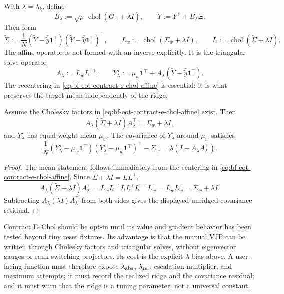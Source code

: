 With \(\lambda=\lambda_k\), define
\[
  B_\lambda
  :=
  \sqrt{\rho}\,\operatorname{chol}(G_+ + \lambda I),
  \qquad
  \widetilde Y
  :=
  Y^+ + B_\lambda\Xi .
\]
Then form
\[
  \widetilde\Sigma
  :=
  \frac1N
  (\widetilde Y-\bar{\widetilde y}\mathbf 1^\top)
  (\widetilde Y-\bar{\widetilde y}\mathbf 1^\top)^\top ,
  \qquad
  L_w:=\operatorname{chol}(\Sigma_w+\lambda I),
  \qquad
  L_{\widetilde{}}:=\operatorname{chol}(\widetilde\Sigma+\lambda I).
\]
The affine operator is not formed with an inverse explicitly.  It is the
triangular-solve operator
\begin{equation}
\label{eq:bf-eot-contract-e-chol-affine}
  A_\lambda
  :=
  L_w L_{\widetilde{}}^{-1},
  \qquad
  Y^\star_\lambda
  :=
  \mu_w\mathbf 1^\top
  +
  A_\lambda(\widetilde Y-\bar{\widetilde y}\mathbf 1^\top).
\end{equation}
The recentering in \eqref{eq:bf-eot-contract-e-chol-affine} is essential: it is
what preserves the target mean independently of the ridge.

\begin{proposition}
\label{prop:bf-eot-contract-e-chol-restoration}
Assume the Cholesky factors in
\eqref{eq:bf-eot-contract-e-chol-affine} exist.  Then
\[
  A_\lambda(\widetilde\Sigma+\lambda I)A_\lambda^\top
  =
  \Sigma_w+\lambda I,
\]
and \(Y^\star_\lambda\) has equal-weight mean \(\mu_w\).  The covariance of
\(Y^\star_\lambda\) around \(\mu_w\) satisfies
\[
  \frac1N
  (Y^\star_\lambda-\mu_w\mathbf 1^\top)
  (Y^\star_\lambda-\mu_w\mathbf 1^\top)^\top
  -
  \Sigma_w
  =
  \lambda(I-A_\lambda A_\lambda^\top).
\]
\end{proposition}

\begin{proof}
The mean statement follows immediately from the centering in
\eqref{eq:bf-eot-contract-e-chol-affine}.  Since
\(\widetilde\Sigma+\lambda I=L_{\widetilde{}}L_{\widetilde{}}^\top\),
\[
  A_\lambda(\widetilde\Sigma+\lambda I)A_\lambda^\top
  =
  L_wL_{\widetilde{}}^{-1}
  L_{\widetilde{}}L_{\widetilde{}}^\top
  L_{\widetilde{}}^{-\top}L_w^\top
  =
  L_wL_w^\top
  =
  \Sigma_w+\lambda I.
\]
Subtracting
\(A_\lambda(\lambda I)A_\lambda^\top\) from both sides gives the displayed
unridged covariance residual.
\end{proof}

Contract E--Chol should be opt-in until its value and gradient behavior has
been tested beyond tiny reset fixtures.  Its advantage is that the manual VJP
can be written through Cholesky factors and triangular solves, without
eigenvector gauges or rank-switching projectors.  Its cost is the explicit
\(\lambda\)-bias above.  A user-facing function must therefore expose
\(\lambda_{\rm abs}\), \(\lambda_{\rm rel}\), escalation multiplier, and maximum
attempts; it must record the realized ridge and the covariance residual; and it
must warn that the ridge is a tuning parameter, not a universal constant.

